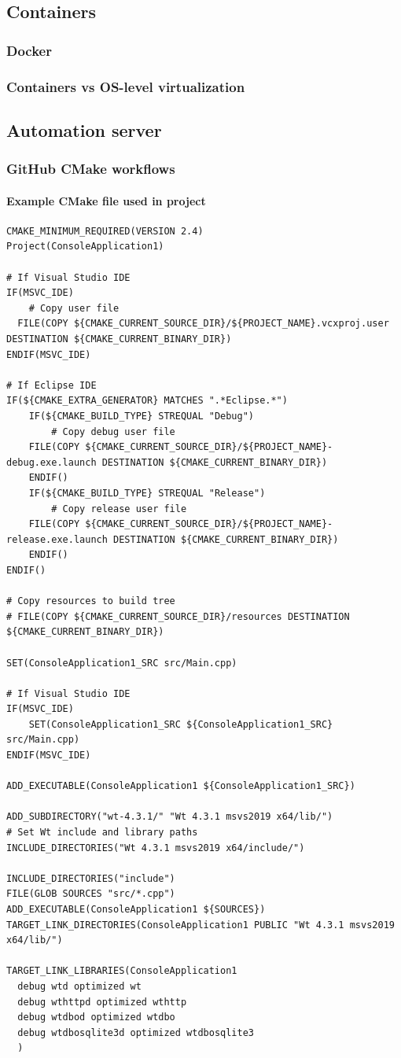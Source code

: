 \documentclass[a4paper,12pt]{article}
\begin{document}
\subsection{Containers}
\subsubsection{Docker}
\subsubsection{Containers vs OS-level virtualization}
\subsection{Automation server}
\subsubsection{GitHub CMake workflows}
\paragraph{Example CMake file used in project}
\begin{verbatim}
CMAKE_MINIMUM_REQUIRED(VERSION 2.4)
Project(ConsoleApplication1)

# If Visual Studio IDE
IF(MSVC_IDE)
	# Copy user file
  FILE(COPY ${CMAKE_CURRENT_SOURCE_DIR}/${PROJECT_NAME}.vcxproj.user DESTINATION ${CMAKE_CURRENT_BINARY_DIR})
ENDIF(MSVC_IDE)

# If Eclipse IDE
IF(${CMAKE_EXTRA_GENERATOR} MATCHES ".*Eclipse.*")
	IF(${CMAKE_BUILD_TYPE} STREQUAL "Debug")
		# Copy debug user file
    FILE(COPY ${CMAKE_CURRENT_SOURCE_DIR}/${PROJECT_NAME}-debug.exe.launch DESTINATION ${CMAKE_CURRENT_BINARY_DIR})
	ENDIF()
	IF(${CMAKE_BUILD_TYPE} STREQUAL "Release")
		# Copy release user file
    FILE(COPY ${CMAKE_CURRENT_SOURCE_DIR}/${PROJECT_NAME}-release.exe.launch DESTINATION ${CMAKE_CURRENT_BINARY_DIR})
	ENDIF()
ENDIF()

# Copy resources to build tree
# FILE(COPY ${CMAKE_CURRENT_SOURCE_DIR}/resources DESTINATION ${CMAKE_CURRENT_BINARY_DIR})

SET(ConsoleApplication1_SRC src/Main.cpp)

# If Visual Studio IDE
IF(MSVC_IDE)
	SET(ConsoleApplication1_SRC ${ConsoleApplication1_SRC} src/Main.cpp)
ENDIF(MSVC_IDE)

ADD_EXECUTABLE(ConsoleApplication1 ${ConsoleApplication1_SRC})

ADD_SUBDIRECTORY("wt-4.3.1/" "Wt 4.3.1 msvs2019 x64/lib/")
# Set Wt include and library paths
INCLUDE_DIRECTORIES("Wt 4.3.1 msvs2019 x64/include/")

INCLUDE_DIRECTORIES("include")
FILE(GLOB SOURCES "src/*.cpp")
ADD_EXECUTABLE(ConsoleApplication1 ${SOURCES})
TARGET_LINK_DIRECTORIES(ConsoleApplication1 PUBLIC "Wt 4.3.1 msvs2019 x64/lib/")

TARGET_LINK_LIBRARIES(ConsoleApplication1
  debug wtd optimized wt
  debug wthttpd optimized wthttp
  debug wtdbod optimized wtdbo
  debug wtdbosqlite3d optimized wtdbosqlite3
  )
\end{verbatim}
\end{document}
